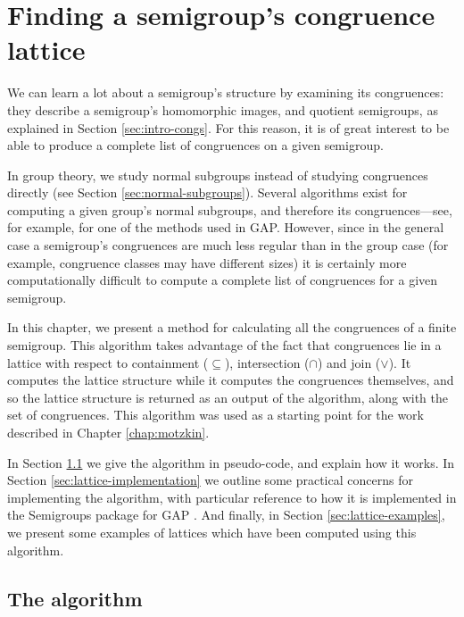 \chapter{Finding a semigroup's congruence lattice}
\label{chap:lattice}

We can learn a lot about a semigroup's structure by examining its congruences:
they describe a semigroup's homomorphic images, and quotient semigroups, as
explained in Section \ref{sec:intro-congs}.  For this reason, it is of great
interest to be able to produce a complete list of congruences on a given
semigroup.

In group theory, we study normal subgroups instead of studying congruences
directly (see Section \ref{sec:normal-subgroups}).  Several algorithms exist for
computing a given group's normal subgroups, and therefore its congruences---see,
for example, \cite{hulpke_1998} for one of the methods used in GAP.  However,
since in the general case a semigroup's congruences are much less regular than
in the group case (for example, congruence classes may have different sizes) it
is certainly more computationally difficult to compute a complete list of
congruences for a given semigroup.

In this chapter, we present a method for calculating all the congruences of a
finite semigroup.  This algorithm takes advantage of the fact that congruences
lie in a lattice with respect to containment ($\subseteq$), intersection
($\cap$) and join ($\vee$).  It computes the lattice structure while it computes
the congruences themselves, and so the lattice structure is returned as an
output of the algorithm, along with the set of congruences.  This algorithm was
used as a starting point for the work described in Chapter \ref{chap:motzkin}.

In Section \ref{sec:lattice-algorithm} we give the algorithm in pseudo-code, and
explain how it works.  In Section \ref{sec:lattice-implementation} we outline
some practical concerns for implementing the algorithm, with particular
reference to how it is implemented in the Semigroups package \cite{semigroups}
for GAP \cite{gap}.  And finally, in Section \ref{sec:lattice-examples}, we
present some examples of lattices which have been computed using this algorithm.

\section{The algorithm}
\label{sec:lattice-algorithm}


